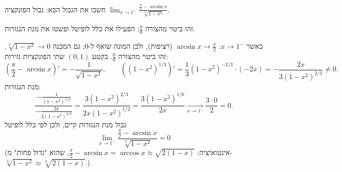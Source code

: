 
\begin{question}
חשבו את הגבול הבא:
גבול הפונקציה $\displaystyle\lim_{x\to1^-}\frac{\frac\pi2-\arcsin x}{\sqrt[3]{1-x^2}}$.
\end{question}

\begin{hint}
זהו ביטוי מהצורה $\frac00$; הפעילו את כלל לופיטל ופשטו את מנת הנגזרות.
\end{hint}

\begin{solution}
כאשר $x\to1^-$: $\arcsin x\to\frac\pi2$ (רציפות), ולכן המונה שואף ל-$0$; גם המכנה $\sqrt[3]{1-x^2}\to0$. זהו ביטוי מהצורה $\frac00$. בקטע $(0,1)$ שתי הפונקציות גזירות:
\[ \left(\frac\pi2-\arcsin x\right)'=-\frac{1}{\sqrt{1-x^2}},\qquad \left((1-x^2)^{1/3}\right)'=\frac13(1-x^2)^{-2/3}\cdot(-2x)=-\frac{2x}{3(1-x^2)^{2/3}}\neq0. \]
מנת הנגזרות:
\[ \frac{-\frac{1}{(1-x^2)^{1/2}}}{-\frac{2x}{3(1-x^2)^{2/3}}}=\frac{3(1-x^2)^{2/3}}{2x(1-x^2)^{1/2}}=\frac{3(1-x^2)^{1/6}}{2x}\xrightarrow[x\to1^-]{}\frac{3\cdot0}{2}=0. \]
גבול מנת הנגזרות קיים, ולכן לפי כלל לופיטל
\[ \boxed{\lim_{x\to1^-}\frac{\frac\pi2-\arcsin x}{\sqrt[3]{1-x^2}}=0} \]
(אינטואיציה: $\frac\pi2-\arcsin x=\arccos x\approx\sqrt{2(1-x)}$, שהוא "גדול פחות" מ-$\sqrt[3]{1-x^2}\approx\sqrt[3]{2(1-x)}$.)
\end{solution}
